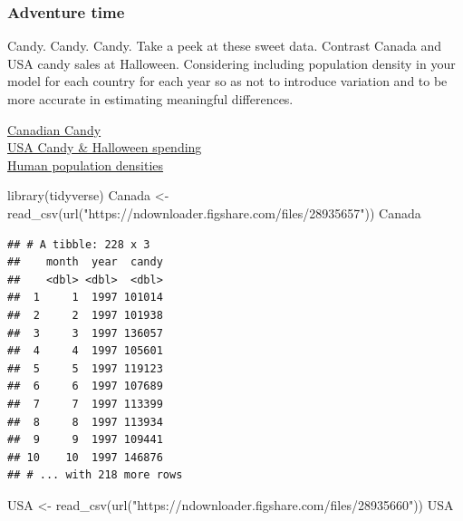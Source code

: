\documentclass[
]{book}
\newenvironment{Shaded}{\begin{snugshade}}{\end{snugshade}}
\newcommand{\FunctionTok}[1]{\textcolor[rgb]{0.00,0.00,0.00}{#1}}
\newcommand{\NormalTok}[1]{#1}
\newcommand{\OtherTok}[1]{\textcolor[rgb]{0.56,0.35,0.01}{#1}}
\newcommand{\StringTok}[1]{\textcolor[rgb]{0.31,0.60,0.02}{#1}}
\begin{document}
\hypertarget{adventure-time-4}{%
\subsubsection*{Adventure time}\label{adventure-time-4}}

Candy. Candy. Candy. Take a peek at these sweet data. Contrast Canada and USA candy sales at Halloween. Considering including population density in your model for each country for each year so as not to introduce variation and to be more accurate in estimating meaningful differences.

\href{https://figshare.com/articles/dataset/Canadian_Candy_Sales/9876386}{Canadian Candy}\\
\href{https://figshare.com/articles/dataset/USA_Halloween_spending_data/9876380}{USA Candy \& Halloween spending}\\
\href{https://figshare.com/articles/dataset/Human_population_density_data/15047379}{Human population densities}

\begin{Shaded}
\begin{Highlighting}[]
\FunctionTok{library}\NormalTok{(tidyverse)}
\NormalTok{Canada }\OtherTok{\textless{}{-}} \FunctionTok{read\_csv}\NormalTok{(}\FunctionTok{url}\NormalTok{(}\StringTok{"https://ndownloader.figshare.com/files/28935657"}\NormalTok{))}
\NormalTok{Canada}
\end{Highlighting}
\end{Shaded}

\begin{verbatim}
## # A tibble: 228 x 3
##    month  year  candy
##    <dbl> <dbl>  <dbl>
##  1     1  1997 101014
##  2     2  1997 101938
##  3     3  1997 136057
##  4     4  1997 105601
##  5     5  1997 119123
##  6     6  1997 107689
##  7     7  1997 113399
##  8     8  1997 113934
##  9     9  1997 109441
## 10    10  1997 146876
## # ... with 218 more rows
\end{verbatim}

\begin{Shaded}
\begin{Highlighting}[]
\NormalTok{USA }\OtherTok{\textless{}{-}} \FunctionTok{read\_csv}\NormalTok{(}\FunctionTok{url}\NormalTok{(}\StringTok{"https://ndownloader.figshare.com/files/28935660"}\NormalTok{))}
\NormalTok{USA}
\end{Highlighting}
\end{Shaded}
\end{document}
